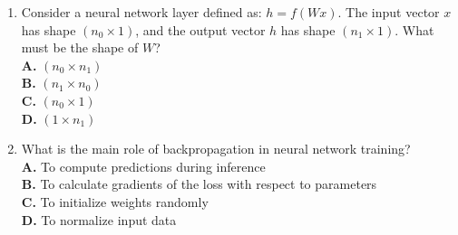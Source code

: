 \documentclass[11pt]{article}
\begin{document}
\begin{enumerate}[label=Q\arabic*., leftmargin=*]
\item Consider a neural network layer defined as: $h = f(Wx)$. The input vector $x$ has shape $(n_0 \times 1)$, and the output vector $h$ has shape $(n_1 \times 1)$. What must be the shape of $W$?\\
\textbf{A.} $(n_0 \times n_1)$\\
\textbf{B.} $(n_1 \times n_0)$\\
\textbf{C.} $(n_0 \times 1)$\\
\textbf{D.} $(1 \times n_1)$

\item What is the main role of backpropagation in neural network training?\\
\textbf{A.} To compute predictions during inference\\
\textbf{B.} To calculate gradients of the loss with respect to parameters\\
\textbf{C.} To initialize weights randomly\\
\textbf{D.} To normalize input data

\end{enumerate}
\end{document}
